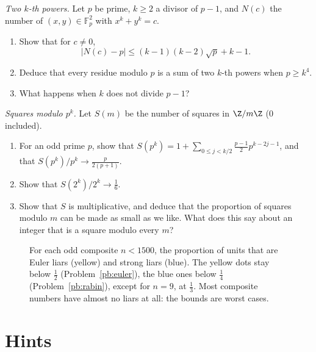 \begin{exercise}[$\star\star\star$]\label{pb:waring}
\emph{Two $k$-th powers.} Let $p$ be prime, $k\ge2$ a divisor of $p-1$, and $N(c)$ the number of $(x,y)\in\mathbb F_p^2$ with
$x^k+y^k=c$.
\begin{enumerate}[label=(\alph*)]
\item Show that for $c\ne0$,
\[
|N(c)-p|\le(k-1)(k-2)\sqrt p+k-1.
\]
\item Deduce that every residue modulo $p$ is a sum of two $k$-th powers when $p\ge k^4$.
\item What happens when $k$ does not divide $p-1$?
\end{enumerate}
\end{exercise}

\begin{exercise}[$\star\star$]\label{pb:squaresmodpk}
\emph{Squares modulo $p^k$.} Let $S(m)$ be the number of squares in $\Z/m\Z$ ($0$ included).
\begin{enumerate}[label=(\alph*)]
\item For an odd prime $p$, show that $S(p^k)=1+\sum_{0\le j<k/2}\frac{p-1}2p^{k-2j-1}$, and that $S(p^k)/p^k\to\frac p{2(p+1)}$.
\item Show that $S(2^k)/2^k\to\frac16$.
\item Show that $S$ is multiplicative, and deduce that the proportion of squares modulo $m$ can be made as small as we like.
What does this say about an integer that is a square modulo every $m$?
\end{enumerate}
\end{exercise}

\begin{figure}[ht]
\centering
{}
\caption{For each odd composite $n<1500$, the proportion of units that are Euler liars (yellow) and strong liars (blue). The
yellow dots stay below $\frac12$ (Problem~\ref{pb:euler}), the blue ones below $\frac14$ (Problem~\ref{pb:rabin}), except for
$n=9$, at $\frac13$. Most composite numbers have almost no liars at all: the bounds are worst cases.}
\label{fig:liars}
\end{figure}

\section{Hints}

